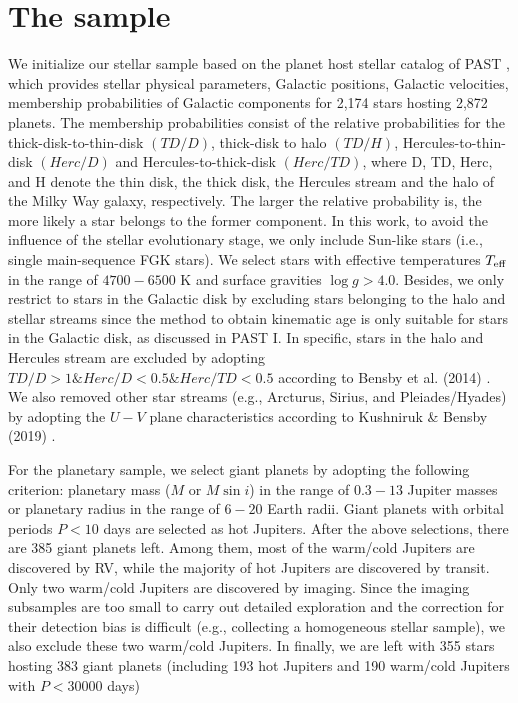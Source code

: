 \documentclass[twocolumn]{pnas-new}
\begin{document}
\section{The sample}
\label{sec.meth.sample}
We initialize our stellar sample based on the planet host stellar catalog of PAST \uppercase\expandafter{} \citep{2021ApJ...909..115C}, which provides stellar physical parameters, Galactic positions, Galactic velocities, membership probabilities of Galactic components for 2,174 stars hosting 2,872 planets.
The membership probabilities consist of the relative probabilities for the thick-disk-to-thin-disk $(TD/D)$, thick-disk to halo $(TD/H)$, Hercules-to-thin-disk $(Herc/D)$ and Hercules-to-thick-disk $(Herc/TD)$, where D, TD, Herc, and H denote the thin disk, the thick disk, the Hercules stream and the halo of the Milky Way galaxy, respectively.
The larger the relative probability is, the more likely a star belongs to the former component.
In this work, to avoid the influence of the stellar evolutionary stage, we only include Sun-like stars (i.e., single main-sequence FGK stars).
We select stars with effective temperatures $T_{\rm eff}$ in the range of $4700-6500$ K and surface gravities $\log g>4.0$. 
Besides, we only restrict to stars in the Galactic disk by excluding stars belonging to the halo and stellar streams since
the method to obtain kinematic age is only suitable for stars in the Galactic disk, as discussed in PAST I.
In specific, stars in the halo and Hercules stream are excluded by adopting $TD/D>1 \& Herc/D<0.5 \& Herc/TD<0.5$ according to Bensby et al. (2014) \citep{2014A&A...562A..71B}. 
We also removed other star streams (e.g., Arcturus, Sirius, and Pleiades/Hyades) by adopting the $U-V$ plane characteristics according to Kushniruk \& Bensby (2019) \citep{2019A&A...631A..47K}.

For the planetary sample, we select giant planets by adopting the following criterion: planetary mass ($M$ or $M\sin i$) in the range of $0.3-13$ Jupiter masses or planetary radius in the range of $6-20$ Earth radii.
Giant planets with orbital periods $P<10$ days are selected as hot Jupiters. 
After the above selections, there are 385 giant planets left.
Among them, most of the warm/cold Jupiters are discovered by RV, while the majority of hot Jupiters are discovered by transit. 
Only two warm/cold Jupiters are discovered by imaging.
Since the imaging subsamples are too small to carry out detailed exploration and the correction for their detection bias is difficult (e.g., collecting a homogeneous stellar sample), we also exclude these two warm/cold Jupiters. 
In finally, we are left with 355 stars hosting 383 giant planets (including 193 hot Jupiters and 190 warm/cold Jupiters with $P<30000$ days)
\end{document}
